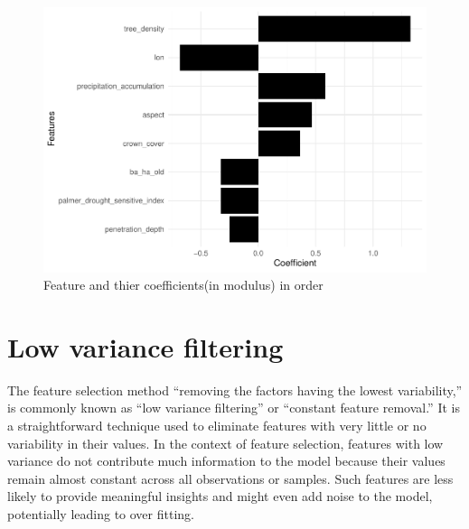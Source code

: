 \documentclass[
]{article}
\begin{document}
\begin{figure}
\centering
\includegraphics{feature_selection_report_files/figure-latex/unnamed-chunk-4-1.pdf}
\caption{Feature and thier coefficients(in modulus) in order}
\end{figure}

\hypertarget{low-variance-filtering}{%
\section{Low variance filtering}\label{low-variance-filtering}}

The feature selection method ``removing the factors having the lowest
variability,'' is commonly known as ``low variance filtering'' or
``constant feature removal.'' It is a straightforward technique used to
eliminate features with very little or no variability in their values.
In the context of feature selection, features with low variance do not
contribute much information to the model because their values remain
almost constant across all observations or samples. Such features are
less likely to provide meaningful insights and might even add noise to
the model, potentially leading to over fitting.
\end{document}
